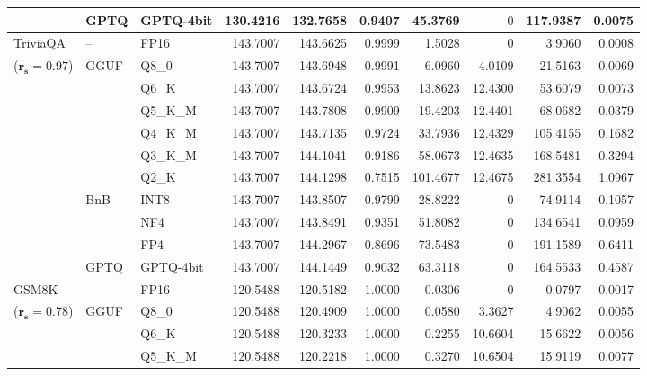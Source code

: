 \begin{longtable}{ll l rrrrrrr}
 & GPTQ & GPTQ-4bit & 130.4216 & 132.7658 & \cellcolor{red!18} 0.9407 & \cellcolor{red!18} 45.3769 & \cellcolor{cyan!12} $0$ & \cellcolor{red!18} 117.9387 & \cellcolor{red!18} 0.0075 \\
\midrule
TriviaQA & -- & FP16 & 143.7007 & 143.6625 & 0.9999 & 1.5028 & \cellcolor{cyan!12} $0$ & 3.9060 & 0.0008 \\
{\small ($\mathbf{r_s{=}0.97}$)} & GGUF & Q8\_0 & 143.7007 & 143.6948 & 0.9991 & 6.0960 & 4.0109 & 21.5163 & 0.0069 \\
 &  & Q6\_K & 143.7007 & 143.6724 & 0.9953 & 13.8623 & 12.4300 & 53.6079 & 0.0073 \\
 &  & Q5\_K\_M & 143.7007 & 143.7808 & 0.9909 & 19.4203 & 12.4401 & 68.0682 & 0.0379 \\
 &  & Q4\_K\_M & 143.7007 & 143.7135 & 0.9724 & 33.7936 & 12.4329 & 105.4155 & 0.1682 \\
 &  & Q3\_K\_M & 143.7007 & 144.1041 & \cellcolor{red!18} 0.9186 & \cellcolor{red!18} 58.0673 & 12.4635 & \cellcolor{red!18} 168.5481 & \cellcolor{red!18} 0.3294 \\
 &  & Q2\_K & 143.7007 & 144.1298 & \cellcolor{red!35} 0.7515 & \cellcolor{red!35} 101.4677 & 12.4675 & \cellcolor{red!35} 281.3554 & \cellcolor{red!35} 1.0967 \\
 & BnB & INT8 & 143.7007 & 143.8507 & 0.9799 & 28.8222 & \cellcolor{cyan!12} $0$ & 74.9114 & 0.1057 \\
 &  & NF4 & 143.7007 & 143.8491 & \cellcolor{red!18} 0.9351 & \cellcolor{red!18} 51.8082 & \cellcolor{cyan!12} $0$ & \cellcolor{red!18} 134.6541 & \cellcolor{red!18} 0.0959 \\
 &  & FP4 & 143.7007 & 144.2967 & \cellcolor{red!18} 0.8696 & \cellcolor{red!18} 73.5483 & \cellcolor{cyan!12} $0$ & \cellcolor{red!18} 191.1589 & \cellcolor{red!18} 0.6411 \\
 & GPTQ & GPTQ-4bit & 143.7007 & 144.1449 & \cellcolor{red!18} 0.9032 & \cellcolor{red!18} 63.3118 & \cellcolor{cyan!12} $0$ & \cellcolor{red!18} 164.5533 & \cellcolor{red!18} 0.4587 \\
\midrule
GSM8K & -- & FP16 & 120.5488 & 120.5182 & 1.0000 & 0.0306 & \cellcolor{cyan!12} $0$ & 0.0797 & 0.0017 \\
{\small ($\mathbf{r_s{=}0.78}$)} & GGUF & Q8\_0 & 120.5488 & 120.4909 & 1.0000 & 0.0580 & 3.3627 & 4.9062 & 0.0055 \\
 &  & Q6\_K & 120.5488 & 120.3233 & 1.0000 & 0.2255 & 10.6604 & 15.6622 & 0.0056 \\
 &  & Q5\_K\_M & 120.5488 & 120.2218 & 1.0000 & 0.3270 & 10.6504 & 15.9119 & 0.0077 \\

\end{longtable}
